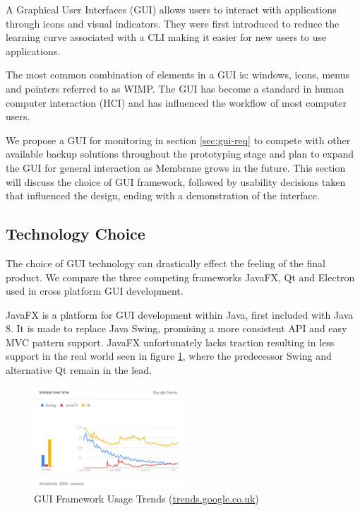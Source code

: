\documentclass[11pt, a4paper, twoside]{report}
\begin{document}
A Graphical User Interfaces (GUI) allows users to interact with applications through icons and visual indicators. They were first introduced to reduce the learning curve associated with a CLI \citep{linfo2004gui} making it easier for new users to use applications.

The most common combination of elements in a GUI is: windows, icons, menus and pointers referred to as WIMP. \citep{van1997post} The GUI has become a standard in human computer interaction (HCI) and has influenced the workflow of most computer users.

We propose a GUI for monitoring in section \ref{sec:gui-req} to compete with other available backup solutions throughout the prototyping stage and plan to expand the GUI for general interaction as Membrane grows in the future. This section will discuss the choice of GUI framework, followed by usability decisions taken that influenced the design, ending with a demonstration of the interface.

\subsection{Technology Choice} \label{sec:gui-technology-choice}

The choice of GUI technology can drastically effect the feeling of the final product. We compare the three competing frameworks JavaFX, Qt and Electron used in cross platform GUI development.

JavaFX is a platform for GUI development within Java, first included with Java 8. It is made to replace Java Swing, promising a more consistent API and easy MVC pattern support. JavaFX unfortunately lacks traction resulting in less support in the real world seen in figure \ref{fig:gui-trends}, where the predecessor Swing and alternative Qt remain in the lead.

\begin{figure}[h]
 \centering
 \includegraphics[width=0.5\textwidth]{gui-trends}
 \caption{GUI Framework Usage Trends (\url{trends.google.co.uk})}
 \label{fig:gui-trends}
\end{figure}
\end{document}
